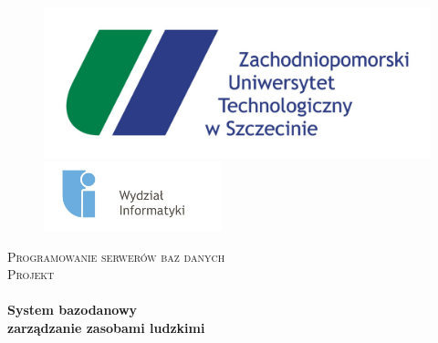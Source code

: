 \begin{titlepage}
\begin{center}


\begin{figure}[ht]
\begin{minipage}[b]{0.45\linewidth}
\centering
\includegraphics[width=\textwidth]{tex/zut_logo}

\end{minipage}
\hspace{0.5cm}
\begin{minipage}[b]{0.45\linewidth}
\centering
\includegraphics[width=\textwidth,height=2cm]{tex/wi_logo}

\end{minipage}
\end{figure}

\textsc{\LARGE Programowanie serwerów baz danych}\\[1.5cm]

\textsc{\Large Projekt}\\[0.5cm]

\HRule \\[0.4cm]
{ \huge \bfseries System bazodanowy\\ zarządzanie zasobami ludzkimi}\\[0.4cm]

\HRule \\[1.5cm]



\end{center}
\end{titlepage}
